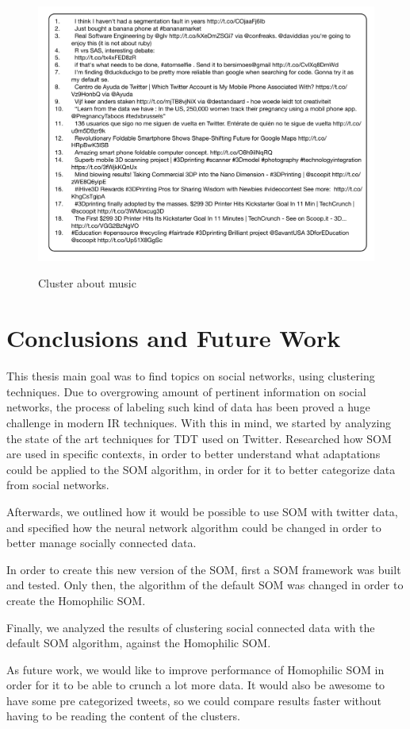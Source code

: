 \documentclass[journal]{IEEEtran}
\begin{document}
\begin{figure}[h]
  \centering
  \includegraphics[width=0.8\linewidth]{./images/2clustertech.pdf}
  \label{clust:music}
  \caption{Cluster about music}
\end{figure}
               
\section{Conclusions and Future Work}

This thesis main goal was to find topics on social networks, using clustering techniques. Due to overgrowing amount of pertinent information on social networks, the process of labeling such kind of data has been proved a huge challenge in modern \ac{IR} techniques. 
With this in mind, we started by analyzing the state of the art techniques for \ac{TDT} used on Twitter. Researched how \ac{SOM} are used in specific contexts, in order to better understand what adaptations could be applied to the \ac{SOM} algorithm, in order for it to better categorize data from social networks.

Afterwards, we outlined how it would be possible to use \ac{SOM} with twitter data, and specified how the neural network algorithm could be changed in order to better manage socially connected data. 

In order to create this new version of the \ac{SOM}, first a \ac{SOM} framework was built and tested. Only then, the algorithm of the default \ac{SOM} was changed in order to create the Homophilic SOM.

Finally, we analyzed the results of clustering social connected data with the default \ac{SOM} algorithm, against the Homophilic SOM.

As future work, we would like to improve performance of Homophilic \ac{SOM} in order for it to be able to crunch a lot more data. It would also be awesome to have some pre categorized tweets, so we could compare results faster without having to be reading the content of the clusters.
\end{document}
